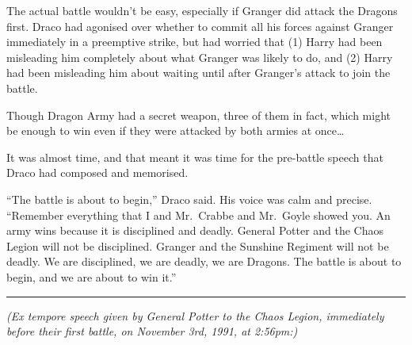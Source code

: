 The actual battle wouldn't be easy, especially if Granger did attack the
Dragons first. Draco had agonised over whether to commit all his forces
against Granger immediately in a preemptive strike, but had worried that
(1) Harry had been misleading him completely about what Granger was
likely to do, and (2) Harry had been misleading him about waiting until
after Granger's attack to join the battle.

Though Dragon Army had a secret weapon, three of them in fact, which
might be enough to win even if they were attacked by both armies at
once\ldots{}

It was almost time, and that meant it was time for the pre-battle speech
that Draco had composed and memorised.

``The battle is about to begin,'' Draco said. His voice was calm and
precise. ``Remember everything that I and Mr.~Crabbe and Mr.~Goyle
showed you. An army wins because it is disciplined and deadly. General
Potter and the Chaos Legion will not be disciplined. Granger and the
Sunshine Regiment will not be deadly. We are disciplined, we are deadly,
we are Dragons. The battle is about to begin, and we are about to win
it.''

\begin{center}\rule{3in}{0.4pt}\end{center}

\emph{(Ex tempore speech given by General Potter to the Chaos Legion,
immediately before their first battle, on November 3rd, 1991, at
2:56pm:)}

